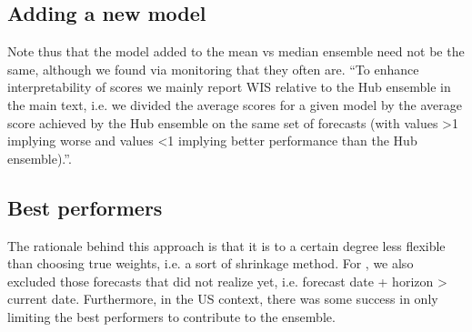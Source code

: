 \subsection{Adding a new model}
Note thus that the model added to the mean vs median ensemble need not be the same, although we found via monitoring that they often are.
``To enhance
interpretability of scores we mainly report WIS relative to the Hub ensemble in the main text, i.e. we divided
the average scores for a given model by the average score achieved by the Hub ensemble on the same set of
forecasts (with values >1 implying worse and values <1 implying better performance than the Hub ensemble).''\cite{bosse_comparing_2021}.
\subsection{Best performers}
The rationale behind this approach is that it is to a certain degree less flexible than choosing true weights, i.e. a sort of shrinkage method.
For , we also excluded those forecasts that did not realize yet, i.e. forecast date + horizon > current date.
Furthermore, in the US context, there was some success in only limiting the best performers to contribute to the ensemble.
